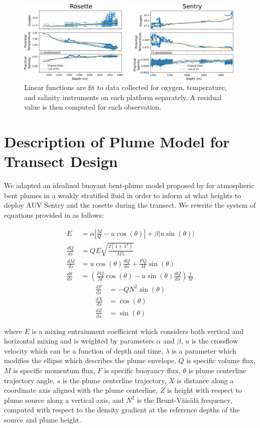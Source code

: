 \begin{figure}[h!]
    \centering
    \includegraphics[width=1\columnwidth]{figures/depth_correction_plots.png}
    \caption[Functions used for depth normalization]{Linear functions are fit to data collected for oxygen, temperature, and salinity instruments on each platform separately. A residual value is then computed for each observation.}
    \label{fig:linear_fits}
\end{figure}

\section{Description of Plume Model for Transect Design}
\label{app:perception:model}
We adapted an idealized buoyant bent-plume model proposed by \cite{tohidi2016highly} for atmospheric bent plumes in a weakly stratified fluid in order to inform at what heights to deploy AUV Sentry and the rosette during the transect. We rewrite the system of equations provided in \cite{tohidi2016highly} as follows:

\begin{align}
    E &= \alpha\left|\frac{M}{Q} - u\cos(\theta)\right| + \beta\left|u\sin(\theta)\right| \\
    \frac{dQ}{ds} &= QE\sqrt{\frac{2(1 + \lambda^2)}{M\lambda}} \\
    \frac{dM}{ds} &= u\cos(\theta)\frac{dQ}{ds} + \frac{FQ}{M}\sin(\theta)\\
    \frac{d\theta}{ds} &= \left(\frac{FQ}{M}\cos(\theta) - u\sin(\theta)\frac{dQ}{ds}\right)\frac{1}{M}
\end{align}
\begin{align}
    \frac{dF}{ds} &= -QN^2\sin(\theta)\\
    \frac{dX}{ds} &= \cos(\theta)\\
    \frac{dZ}{ds} &= \sin(\theta)
\end{align}

\noindent where $E$ is a mixing entrainment coefficient which considers both vertical and horizontal mixing and is weighted by parameters $\alpha$ and $\beta$, $u$ is the crossflow velocity which can be a function of depth and time, $\lambda$ is a parameter which modifies the ellipse which describes the plume envelope, $Q$ is specific volume flux, $M$ is specific momentum flux, $F$ is specific buoyancy flux, $\theta$ is plume centerline trajectory angle, $s$ is the plume centerline trajectory, $X$ is distance along a coordinate axis aligned with the plume centerline, $Z$ is height with respect to plume source along a vertical axis, and $N^2$ is the Brunt-V\"ais\"al\"a frequency, computed with respect to the density gradient at the reference depths of the source and plume height.

